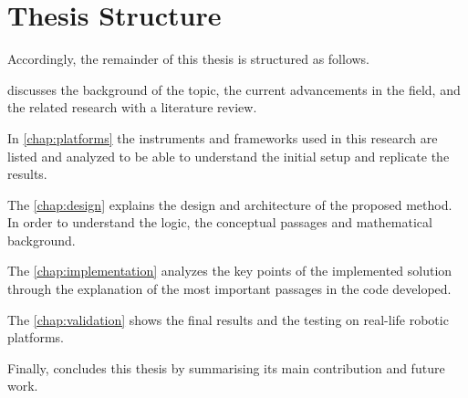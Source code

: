 \section{Thesis Structure} 
Accordingly, the remainder of this thesis is structured as follows.

 discusses the background of the topic, the current advancements in the field, and the related research with a literature review. 

In \cref{chap:platforms} the instruments and frameworks used in this research are listed and analyzed to be able to understand the initial setup and replicate the results. 

The \cref{chap:design} explains the design and architecture of the proposed method. In order to understand the logic, the conceptual passages and mathematical background. 

The \cref{chap:implementation} analyzes the key points of the implemented solution through the explanation of the most important passages in the code developed.

The \cref{chap:validation} shows the final results and the testing on real-life robotic platforms.

Finally,  concludes this thesis by summarising its main contribution and future work.
